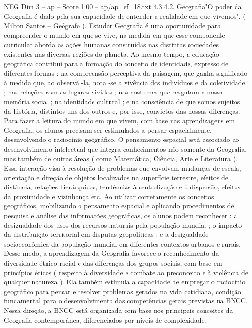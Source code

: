 \begin{textsample}{NEG Dim 3 – ap – Score 1.00 – ap/ap\_ef\_18.txt}  \label{ex:f3_neg_102}
4.3.4.2.
Geografia"O poder da Geografia é dado pela sua capacidade de entender a realidade em que vivemos". ( Milton Santos – Geógrafo ).
Estudar Geografia é uma oportunidade para compreender o mundo em que se vive, na medida em que esse componente curricular aborda as ações humanas construídas nas distintas sociedades existentes nas diversas regiões do planeta.
Ao mesmo tempo, a educação geográfica contribui para a formação do conceito de identidade, expresso de diferentes formas : na compreensão perceptiva da paisagem, que ganha significado à medida que, ao observá -la, nota -se a vivência dos indivíduos e da coletividade ; nas relações com os lugares vividos ; nos costumes que resgatam a nossa memória social ; na identidade cultural ; e na consciência de que somos sujeitos da história, distintos uns dos outros e, por isso, convictos das nossas diferenças.
Para fazer a leitura do mundo em que vivem, com base nas aprendizagens em Geografia, os alunos precisam ser estimulados a pensar espacialmente, desenvolvendo o raciocínio geográfico.
O pensamento espacial está associado ao desenvolvimento intelectual que integra conhecimentos não somente da Geografia, mas também de outras áreas ( como Matemática, Ciência, Arte e Literatura ).
Essa interação visa à resolução de problemas que envolvem mudanças de escala, orientação e direção de objetos localizados na superfície terrestre, efeitos de distância, relações hierárquicas, tendências à centralização e à dispersão, efeitos da proximidade e vizinhança etc.
Ao utilizar corretamente os conceitos geográficos, mobilizando o pensamento espacial e aplicando procedimentos de pesquisa e análise das informações geográficas, os alunos podem reconhecer : a desigualdade dos usos dos recursos naturais pela população mundial ; o impacto da distribuição territorial em disputas geopolíticas ; e a desigualdade socioeconômica da população mundial em diferentes contextos urbanos e rurais.
Desse modo, a aprendizagem da Geografia favorece o reconhecimento da diversidade étnico-racial e das diferenças dos grupos sociais, com base em princípios éticos ( respeito à diversidade e combate ao preconceito e à violência de qualquer natureza ).
Ela também estimula a capacidade de empregar o raciocínio geográfico para pensar e resolver problemas gerados na vida cotidiana, condição fundamental para o desenvolvimento das competências gerais previstas na BNCC.
Nessa direção, a BNCC está organizada com base nos principais conceitos da Geografia contemporânea, diferenciados por níveis de complexidade.

\end{textsample}
